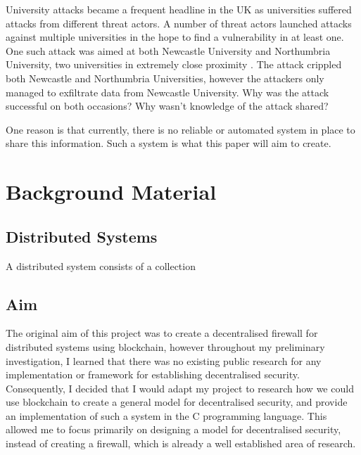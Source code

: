 \documentclass[a4paper]{report}
\begin{document}
University attacks became a frequent headline in the UK as universities suffered attacks from different threat actors. A number of threat actors launched attacks against multiple universities in the hope to find a vulnerability in at least one. One such attack was aimed at both Newcastle University and Northumbria University, two universities in extremely close proximity \cite{newhack,norhack}. The attack crippled both Newcastle and Northumbria Universities, however the attackers only managed to exfiltrate data from Newcastle University. Why was the attack successful on both occasions? Why wasn't knowledge of the attack shared? 

One reason is that currently, there is no reliable or automated system in place to share this information. Such a system is what this paper will aim to create. 

\chapter{Background Material}

\section{Distributed Systems}
A distributed system consists of a collection 



\section{Aim}
The original aim of this project was to create a decentralised firewall for distributed systems using blockchain, however throughout my preliminary investigation, I learned that there was no existing public research for any implementation or framework for establishing decentralised security.
Consequently, I decided that I would adapt my project to research how we could use blockchain to create a general model for decentralised security, and provide an implementation of such a system in the C programming language. This allowed me to focus primarily on designing a model for decentralised security, instead of creating a firewall, which is already a well established area of research.
\end{document}
